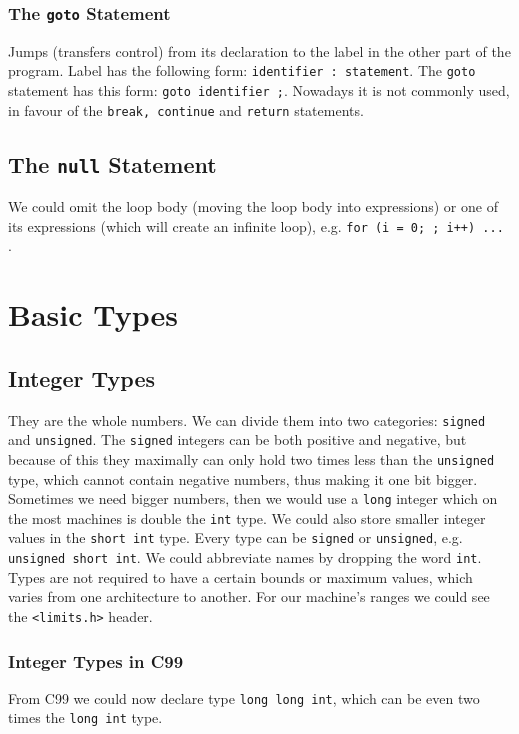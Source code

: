 \documentclass[openany]{book}
\begin{document}
    \subsection*{The \texttt{goto} Statement}
    Jumps (transfers control) from its declaration to the label in the other part of the program. Label has the following form: \texttt{identifier : statement}. The \texttt{goto} statement has this form: \texttt{goto identifier ;}. Nowadays it is not commonly used, in favour of the \texttt{break, continue} and \texttt{return} statements.

    \section{The \texttt{null} Statement}
    We could omit the loop body (moving the loop body into expressions) or one of its expressions (which will create an infinite loop), e.g. \texttt{for (i = 0; ; i++) {...} }.



    \chapter{Basic Types}

    \section{Integer Types}
    They are the whole numbers. We can divide them into two categories: \texttt{signed} and \texttt{unsigned}. The \texttt{signed} integers can be both positive and negative, but because of this they maximally can only hold two times less than the \texttt{unsigned} type, which cannot contain negative numbers, thus making it one bit bigger. Sometimes we need bigger numbers, then we would use a \texttt{long} integer which on the most machines is double the \texttt{int} type. We could also store smaller integer values in the \texttt{short int} type. Every type can be \texttt{signed} or \texttt{unsigned}, e.g. \texttt{unsigned short int}. We could abbreviate names by dropping the word \texttt{int}. Types are not required to have a certain bounds or maximum values, which varies from one architecture to another. For our machine's ranges we could see the \texttt{<limits.h>} header.

    \subsection*{Integer Types in C99}
    From C99 we could now declare type \texttt{long long int}, which can be even two times the \texttt{long int} type.
\end{document}
